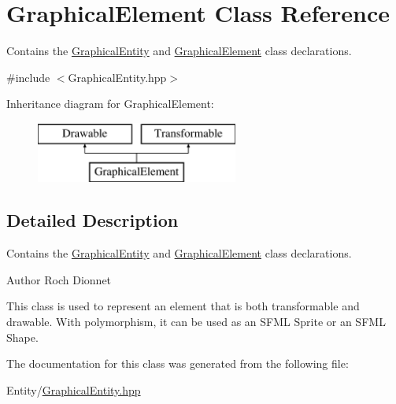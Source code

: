 \hypertarget{class_graphical_element}{}\section{Graphical\+Element Class Reference}
\label{class_graphical_element}


Contains the \hyperlink{class_graphical_entity}{Graphical\+Entity} and \hyperlink{class_graphical_element}{Graphical\+Element} class declarations.  




{\ttfamily \#include $<$Graphical\+Entity.\+hpp$>$}

Inheritance diagram for Graphical\+Element\+:\begin{figure}[H]
\begin{center}
\leavevmode
\includegraphics[height=2.000000cm]{class_graphical_element}
\end{center}
\end{figure}


\subsection{Detailed Description}
Contains the \hyperlink{class_graphical_entity}{Graphical\+Entity} and \hyperlink{class_graphical_element}{Graphical\+Element} class declarations. 

\begin{DoxyAuthor}{Author}
Roch Dionnet
\end{DoxyAuthor}
This class is used to represent an element that is both transformable and drawable. With polymorphism, it can be used as an S\+F\+M\+L Sprite or an S\+F\+M\+L Shape. 

The documentation for this class was generated from the following file\+:\begin{DoxyCompactItemize}
\item 
Entity/\hyperlink{_graphical_entity_8hpp}{Graphical\+Entity.\+hpp}\end{DoxyCompactItemize}
